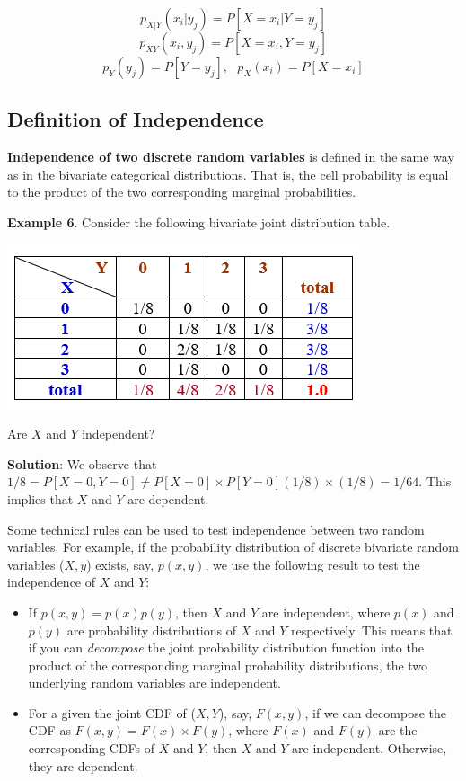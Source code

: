 \documentclass[
]{book}
\begin{document}
\[
p_{X|Y}(x_i|y_j) = P[X=x_i|Y=y_j]
\]
\[
p_{XY}(x_i,y_j)=P[X=x_i, Y=y_j]
\]
\[
p_Y(y_j)=P[Y=y_j], \ \ \ p_X(x_i) = P[X=x_i]
\]

\hypertarget{definition-of-independence}{%
\subsection{Definition of Independence}\label{definition-of-independence}}

\textbf{Independence of two discrete random variables} is defined in the same way as in the bivariate categorical distributions. That is, the cell probability is equal to the product of the two corresponding marginal probabilities.

\textbf{Example 6}. Consider the following bivariate joint distribution table.

\begin{center}\includegraphics[width=0.45\linewidth]{topic07/example05DiscreteDist} \end{center}

Are \(X\) and \(Y\) independent?

\textbf{Solution}: We observe that \(1/8 = P[X=0, Y=0] \ne P[X=0]\times P[Y=0] (1/8)\times(1/8) = 1/64\). This implies that \(X\) and \(Y\) are dependent.

\hfill\break

Some technical rules can be used to test independence between two random variables. For example, if the probability distribution of discrete bivariate random variables (\(X,y\)) exists, say, \(p(x,y)\), we use the following result to test the independence of \(X\) and \(Y\):

\begin{itemize}
\item
  If \(p(x,y) = p(x)p(y)\), then \(X\) and \(Y\) are independent, where \(p(x)\) and \(p(y)\) are probability distributions of \(X\) and \(Y\) respectively. This means that if you can \emph{decompose} the joint probability distribution function into the product of the corresponding marginal probability distributions, the two underlying random variables are independent.
\item
  For a given the joint CDF of (\(X, Y\)), say, \(F(x,y)\), if we can decompose the CDF as \(F(x,y) = F(x)\times F(y)\), where \(F(x)\) and \(F(y)\) are the corresponding CDFs of \(X\) and \(Y\), then \(X\) and \(Y\) are independent. Otherwise, they are dependent.
\end{itemize}
\end{document}
